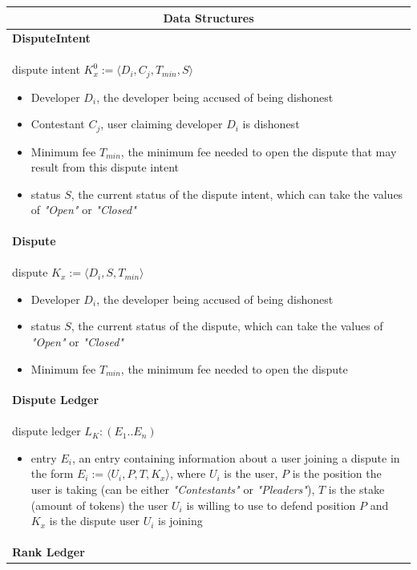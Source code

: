 \begin{table}[H]
\footnotesize
\centering
\begin{tabular}{|p{}|}
\hline
\multicolumn{1}{|c|}{Data Structures} \\
\hline \vspace{0.05cm}
\textbf{DisputeIntent} \\
dispute intent $K^{0}_{x} := \langle D_i, C_j, T_{min}, S\rangle$
\begin{itemize}
	\item Developer $D_i$, the developer being accused of being dishonest
	\item Contestant $C_j$, user claiming developer $D_i$ is dishonest
	\item Minimum fee $T_{min}$, the minimum fee needed to open the dispute that may result from this dispute intent
	\item status $S$, the current status of the dispute intent, which can take the values of \textit{"Open"} or \textit{"Closed"}
\end{itemize} \\
\textbf{Dispute} \\
dispute $K_x := \langle D_i, S, T_{min}\rangle$
\begin{itemize}
	\item Developer $D_i$, the developer being accused of being dishonest
	\item status $S$, the current status of the dispute, which can take the values of \textit{"Open"} or \textit{"Closed"}
	\item Minimum fee $T_{min}$, the minimum fee needed to open the dispute
\end{itemize} \\
\textbf{Dispute Ledger} \\
dispute ledger $L_{K} : (E_1..E_n)$
\begin{itemize}
	\item entry $E_i$, an entry containing information about a user joining a dispute in the form $E_i := \langle U_i, P, T, K_x\rangle$, where $U_i$ is the user, $P$ is the position the user is taking (can be either \textit{"Contestants"} or \textit{"Pleaders"}), $T$ is the stake (amount of tokens) the user $U_i$ is willing to use to defend position $P$ and $K_x$ is the dispute user $U_i$ is joining
\end{itemize} \\
\textbf{Rank Ledger} \\

\end{tabular}
\end{table}
